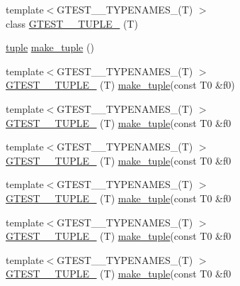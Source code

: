 \begin{DoxyCompactItemize}
\item 
{\footnotesize template$<$G\+T\+E\+S\+T\+\_\+\_\+\+T\+Y\+P\+E\+N\+A\+M\+E\+S\+\_\+(\+T) $>$ }\\class \hyperlink{namespacestd_1_1tr1_ab4f2c7d5458171bec6c4330fc5c7aba6}{G\+T\+E\+S\+T\+\_\+\_\+\+T\+U\+P\+L\+E\+\_\+} (T)
\item 
\hyperlink{classstd_1_1tr1_1_1tuple}{tuple} \hyperlink{namespacestd_1_1tr1_af7e12a0f5b5791b5b7c49a5a17b85359}{make\+\_\+tuple} ()
\item 
{\footnotesize template$<$G\+T\+E\+S\+T\+\_\+\_\+\+T\+Y\+P\+E\+N\+A\+M\+E\+S\+\_\+(\+T) $>$ }\\\hyperlink{namespacestd_1_1tr1_a8b196fb65b7521a688f59c51418ab191}{G\+T\+E\+S\+T\+\_\+\_\+\+T\+U\+P\+L\+E\+\_\+} (T) \hyperlink{namespacestd_1_1tr1_af7e12a0f5b5791b5b7c49a5a17b85359}{make\+\_\+tuple}(const T0 \&f0)
\item 
{\footnotesize template$<$G\+T\+E\+S\+T\+\_\+\_\+\+T\+Y\+P\+E\+N\+A\+M\+E\+S\+\_\+(\+T) $>$ }\\\hyperlink{namespacestd_1_1tr1_a90d9f0e7f95fa1c2093372d72493c3c1}{G\+T\+E\+S\+T\+\_\+\_\+\+T\+U\+P\+L\+E\+\_\+} (T) \hyperlink{namespacestd_1_1tr1_af7e12a0f5b5791b5b7c49a5a17b85359}{make\+\_\+tuple}(const T0 \&f0
\item 
{\footnotesize template$<$G\+T\+E\+S\+T\+\_\+\_\+\+T\+Y\+P\+E\+N\+A\+M\+E\+S\+\_\+(\+T) $>$ }\\\hyperlink{namespacestd_1_1tr1_a4493d91e61718415264f7e72fea42930}{G\+T\+E\+S\+T\+\_\+\_\+\+T\+U\+P\+L\+E\+\_\+} (T) \hyperlink{namespacestd_1_1tr1_af7e12a0f5b5791b5b7c49a5a17b85359}{make\+\_\+tuple}(const T0 \&f0
\item 
{\footnotesize template$<$G\+T\+E\+S\+T\+\_\+\_\+\+T\+Y\+P\+E\+N\+A\+M\+E\+S\+\_\+(\+T) $>$ }\\\hyperlink{namespacestd_1_1tr1_a4e57e6fab4219802275bd31821b31b58}{G\+T\+E\+S\+T\+\_\+\_\+\+T\+U\+P\+L\+E\+\_\+} (T) \hyperlink{namespacestd_1_1tr1_af7e12a0f5b5791b5b7c49a5a17b85359}{make\+\_\+tuple}(const T0 \&f0
\item 
{\footnotesize template$<$G\+T\+E\+S\+T\+\_\+\_\+\+T\+Y\+P\+E\+N\+A\+M\+E\+S\+\_\+(\+T) $>$ }\\\hyperlink{namespacestd_1_1tr1_a6f8af2da768a7ea1e48b2700d1288166}{G\+T\+E\+S\+T\+\_\+\_\+\+T\+U\+P\+L\+E\+\_\+} (T) \hyperlink{namespacestd_1_1tr1_af7e12a0f5b5791b5b7c49a5a17b85359}{make\+\_\+tuple}(const T0 \&f0
\item 
{\footnotesize template$<$G\+T\+E\+S\+T\+\_\+\_\+\+T\+Y\+P\+E\+N\+A\+M\+E\+S\+\_\+(\+T) $>$ }\\\hyperlink{namespacestd_1_1tr1_a31cde155977a4544af2b44b51ffe69ac}{G\+T\+E\+S\+T\+\_\+\_\+\+T\+U\+P\+L\+E\+\_\+} (T) \hyperlink{namespacestd_1_1tr1_af7e12a0f5b5791b5b7c49a5a17b85359}{make\+\_\+tuple}(const T0 \&f0

\end{DoxyCompactItemize}
